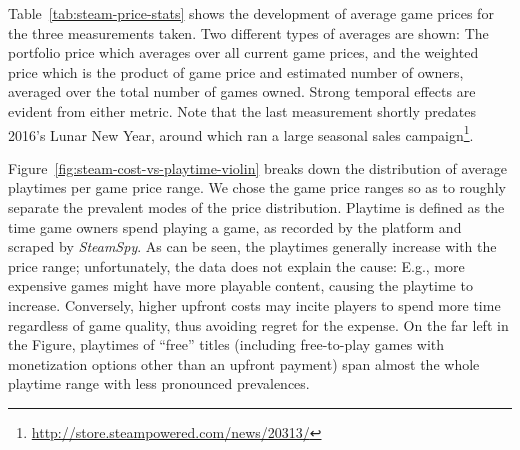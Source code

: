 Table~\ref{tab:steam-price-stats} shows the development of average \steam game prices for the three measurements taken. Two different types of averages are shown: The portfolio price which averages over all current game prices, and the weighted price which is the product of game price and estimated number of owners, averaged over the total number of games owned. Strong temporal effects are evident from either metric. Note that the last measurement shortly predates 2016's Lunar New Year, around which \steam ran a large seasonal sales campaign\footnote{\url{http://store.steampowered.com/news/20313/}}.



Figure~\ref{fig:steam-cost-vs-playtime-violin} breaks down the distribution of average playtimes per game price range. We chose the game price ranges so as to roughly separate the prevalent modes of the price distribution. %
Playtime is defined as the time game owners spend playing a game, as recorded by the \steam platform and scraped by \textit{SteamSpy}. As can be seen, the playtimes generally increase with the price range; unfortunately, the data does not explain the cause: E.g., more expensive games might have more playable content, causing the playtime to increase. Conversely, higher upfront costs may incite players to spend more time regardless of game quality, thus avoiding regret for the expense. On the far left in the Figure, playtimes of ``free'' titles (including free-to-play games with monetization options other than an upfront payment) span almost the whole playtime range with less pronounced prevalences.


